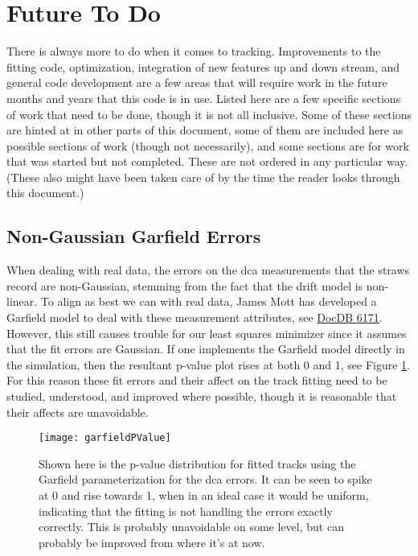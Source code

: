 \section{Future To Do}

	There is always more to do when it comes to tracking. Improvements to the fitting code, optimization, integration of new features up and down stream, and general code development are a few areas that will require work in the future months and years that this code is in use. Listed here are a few specific sections of work that need to be done, though it is not all inclusive. Some of these sections are hinted at in other parts of this document, some of them are included here as possible sections of work (though not necessarily), and some sections are for work that was started but not completed. These are not ordered in any particular way. (These also might have been taken care of by the time the reader looks through this document.)

	\subsection{Non-Gaussian Garfield Errors}

		When dealing with real data, the errors on the dca measurements that the straws record are non-Gaussian, stemming from the fact that the drift model is non-linear. To align as best we can with real data, James Mott has developed a Garfield model to deal with these measurement attributes, see \href{https://gm2-docdb.fnal.gov/cgi-bin/private/ShowDocument?docid=6171}{DocDB 6171}. However, this still causes trouble for our least squares minimizer since it assumes that the fit errors are Gaussian. If one implements the Garfield model directly in the simulation, then the resultant p-value plot rises at both 0 and 1, see Figure \ref{fig:garfieldPValue}. For this reason these fit errors and their affect on the track fitting need to be studied, understood, and improved where possible, though it is reasonable that their affects are unavoidable.

			\begin{figure}[]
				\caption{Shown here is the p-value distribution for fitted tracks using the Garfield parameterization for the dca errors. It can be seen to spike at 0 and rise towards 1, when in an ideal case it would be uniform, indicating that the fitting is not handling the errors exactly correctly. This is probably unavoidable on some level, but can probably be improved from where it's at now.}
				\centering
				\texttt{[image: garfieldPValue]}
				\label{fig:garfieldPValue}
			\end{figure}

